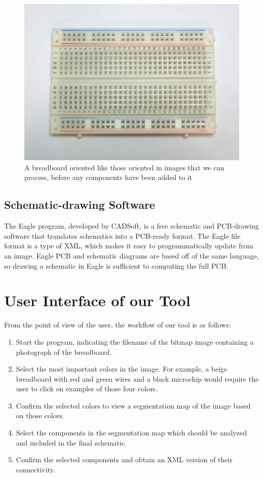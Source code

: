 \documentclass[10pt,twocolumn,letterpaper]{article}
\begin{document}
\begin{figure}[t]
\begin{center}
   \includegraphics[width=0.8\linewidth]{imgs/breadboard.jpg}
\end{center}
   \caption{A breadboard oriented like those oriented in images that
     we can process, before any components have been added to it}
\label{fig:board}
\end{figure}

\subsection{Schematic-drawing Software}

The Eagle program, developed by CADSoft, is a free schematic and PCB-drawing
software that translates schematics into a PCB-ready format. The Eagle file
format is a type of XML, which makes it easy to programmatically update from an
image. Eagle PCB and schematic diagrams are based off of the same language, so
drawing a schematic in Eagle is sufficient to computing the full PCB. 


\section{User Interface of our Tool}

From the point of view of the user, the workflow of our tool is as
follows:

\begin{enumerate}
\item Start the program, indicating the filename of the bitmap image
  containing a photograph of the breadboard.
\item Select the most important colors in the image. For example, a
  beige breadboard with red and green wires and a black microchip
  would require the user to click on examples of those four colors.
\item Confirm the selected colors to view a segmentation map of the image
  based on those colors.
\item Select the components in the segmentation map which should be
  analyzed and included in the final schematic.
\item Confirm the selected components and obtain an XML version of
  their connectivity.
\end{enumerate}
\end{document}

